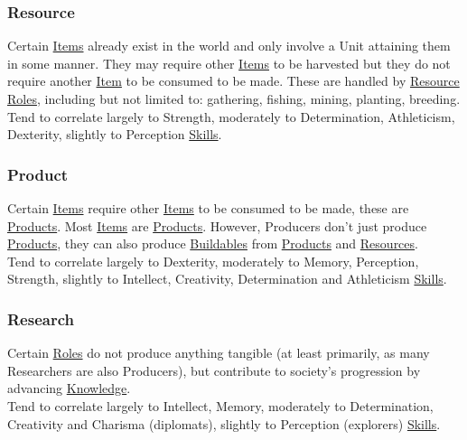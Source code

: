\documentclass[11pt]{article}
\begin{document}
\subsubsection{Resource \label{org20641a7} \label{orgd69054e}}
\label{sec:org61053f2}
Certain \hyperref[org4612467]{Items} already exist in the world and only involve a Unit attaining them in some manner. They may require other \hyperref[org4612467]{Items} to be harvested but they do not require another \hyperref[org1f7c3b7]{Item} to be consumed to be made. These are handled by \hyperref[org20641a7]{Resource} \hyperref[org080bb13]{Roles}, including but not limited to: gathering, fishing, mining, planting, breeding.\\

Tend to correlate largely to Strength, moderately to Determination, Athleticism, Dexterity, slightly to Perception \hyperref[org58ad070]{Skills}.\\
\subsubsection{Product \label{org5730b6c} \label{orgc5e54a9}}
\label{sec:org002ce72}
Certain \hyperref[org4612467]{Items} require other \hyperref[org4612467]{Items} to be consumed to be made, these are \hyperref[orgc5e54a9]{Products}. Most \hyperref[org4612467]{Items} are \hyperref[orgc5e54a9]{Products}. However, Producers don't just produce \hyperref[orgc5e54a9]{Products}, they can also produce \hyperref[orgb7b8c78]{Buildables} from \hyperref[orgc5e54a9]{Products} and \hyperref[orgd69054e]{Resources}.\\

Tend to correlate largely to Dexterity, moderately to Memory, Perception, Strength, slightly to Intellect, Creativity, Determination and Athleticism \hyperref[org58ad070]{Skills}.\\
\subsubsection{Research \label{orga5818bf} \label{org58a2cd3}}
\label{sec:orgcd943db}
Certain \hyperref[org080bb13]{Roles} do not produce anything tangible (at least primarily, as many Researchers are also Producers), but contribute to society's progression by advancing \hyperref[orgd7203c2]{Knowledge}.\\

Tend to correlate largely to Intellect, Memory, moderately to Determination, Creativity and Charisma (diplomats), slightly to Perception (explorers) \hyperref[org58ad070]{Skills}.\\
\end{document}
